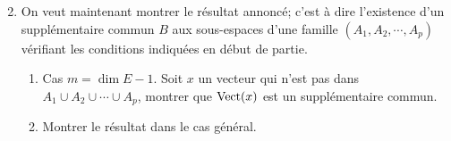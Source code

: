 \begin{enumerate}
\begin{displaymath}
\end{displaymath}
\item On veut maintenant montrer le résultat annoncé; c'est à dire l'existence d'un supplémentaire commun $B$ aux sous-espaces d'une famille $(A_1,A_2,\cdots,A_p)$ vérifiant les conditions indiquées en début de partie.
\begin{enumerate}
 \item Cas $m=\dim E -1$. Soit $x$ un vecteur qui n'est pas dans $A_1\cup A_2\cup \cdots \cup A_p$, montrer que $\operatorname{Vect} (x)$ est un supplémentaire commun.
\item Montrer le résultat dans le cas général.
\end{enumerate}

\end{enumerate}
